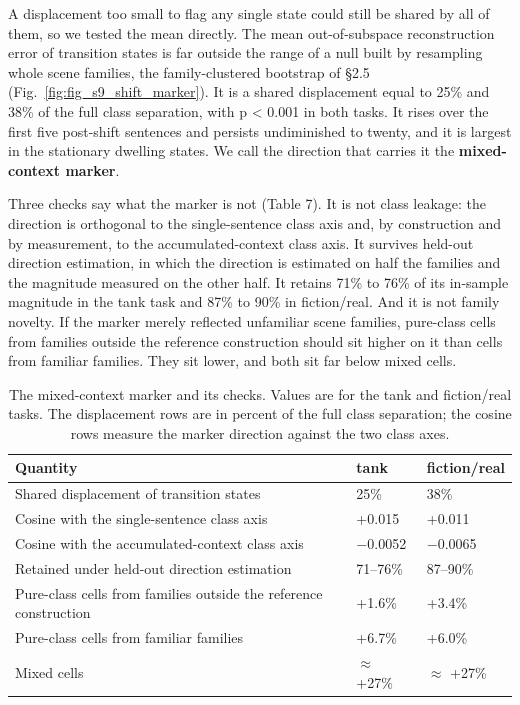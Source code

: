 \documentclass[11pt]{article}
\begin{document}
A displacement too small to flag any single state could still be shared by all of
them, so we tested the mean directly. The mean out-of-subspace reconstruction error of transition states
is far outside the range of a null built by resampling whole scene families, the
family-clustered bootstrap of \S2.5 (Fig.~\ref{fig:fig_s9_shift_marker}).
It is a shared displacement equal to 25\% and 38\% of the full class separation, with
p < 0.001 in both tasks. It rises over the first five post-shift sentences and persists
undiminished to twenty, and it is largest in the stationary dwelling states. We call
the direction that carries it the \textbf{mixed-context marker}.

Three checks say what the marker is not (Table 7). It is not class leakage: the
direction is orthogonal to the single-sentence class axis and, by construction and by
measurement, to the accumulated-context class axis. It survives held-out direction estimation, in which the direction is estimated on
half the families and the magnitude measured on the other half. It retains 71\% to
76\% of its in-sample magnitude in the tank task and 87\% to 90\% in fiction/real. And it is not family
novelty. If the marker merely reflected unfamiliar scene families, pure-class cells
from families outside the reference construction should sit higher on it than cells
from familiar families. They sit lower, and both sit far below mixed cells.



\begin{table}[htbp]\centering\small
\caption{The mixed-context marker and its checks. Values are for the tank and
fiction/real tasks. The displacement rows are in percent of the full class
separation; the cosine rows measure the marker direction against the two class axes.}
\begin{tabularx}{\linewidth}{lll}
\toprule
Quantity & tank & fiction/real \\
\midrule
Shared displacement of transition states & 25\% & 38\% \\
\addlinespace
Cosine with the single-sentence class axis & +0.015 & +0.011 \\
\addlinespace
Cosine with the accumulated-context class axis & $-$0.0052 & $-$0.0065 \\
\addlinespace
Retained under held-out direction estimation & 71–76\% & 87–90\% \\
\addlinespace
Pure-class cells from families outside the reference construction & +1.6\% & +3.4\% \\
\addlinespace
Pure-class cells from familiar families & +6.7\% & +6.0\% \\
\addlinespace
Mixed cells & $\approx$ +27\% & $\approx$ +27\% \\
\bottomrule
\end{tabularx}
\end{table}
\end{document}
